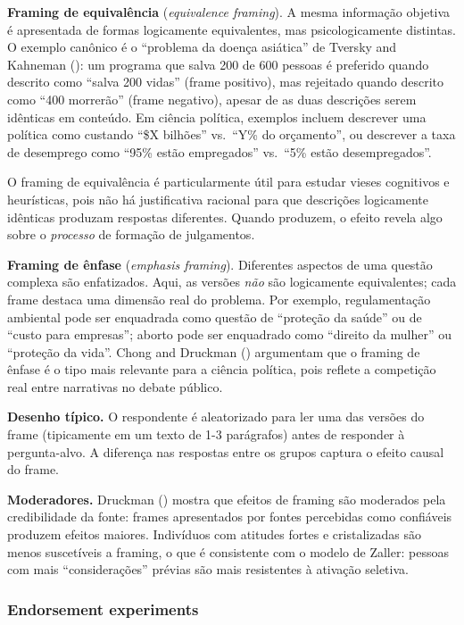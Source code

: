 \documentclass[
]{article}
\begin{document}
\textbf{Framing de equivalência} (\emph{equivalence framing}). A mesma informação objetiva é apresentada de formas logicamente equivalentes, mas psicologicamente distintas. O exemplo canônico é o ``problema da doença asiática'' de Tversky and Kahneman (): um programa que salva 200 de 600 pessoas é preferido quando descrito como ``salva 200 vidas'' (frame positivo), mas rejeitado quando descrito como ``400 morrerão'' (frame negativo), apesar de as duas descrições serem idênticas em conteúdo. Em ciência política, exemplos incluem descrever uma política como custando ``\$X bilhões'' vs.~``Y\% do orçamento'', ou descrever a taxa de desemprego como ``95\% estão empregados'' vs.~``5\% estão desempregados''.

O framing de equivalência é particularmente útil para estudar vieses cognitivos e heurísticas, pois não há justificativa racional para que descrições logicamente idênticas produzam respostas diferentes. Quando produzem, o efeito revela algo sobre o \emph{processo} de formação de julgamentos.

\textbf{Framing de ênfase} (\emph{emphasis framing}). Diferentes aspectos de uma questão complexa são enfatizados. Aqui, as versões \emph{não} são logicamente equivalentes; cada frame destaca uma dimensão real do problema. Por exemplo, regulamentação ambiental pode ser enquadrada como questão de ``proteção da saúde'' ou de ``custo para empresas''; aborto pode ser enquadrado como ``direito da mulher'' ou ``proteção da vida''. Chong and Druckman () argumentam que o framing de ênfase é o tipo mais relevante para a ciência política, pois reflete a competição real entre narrativas no debate público.

\textbf{Desenho típico.} O respondente é aleatorizado para ler uma das versões do frame (tipicamente em um texto de 1-3 parágrafos) antes de responder à pergunta-alvo. A diferença nas respostas entre os grupos captura o efeito causal do frame.

\textbf{Moderadores.} Druckman () mostra que efeitos de framing são moderados pela credibilidade da fonte: frames apresentados por fontes percebidas como confiáveis produzem efeitos maiores. Indivíduos com atitudes fortes e cristalizadas são menos suscetíveis a framing, o que é consistente com o modelo de Zaller: pessoas com mais ``considerações'' prévias são mais resistentes à ativação seletiva.

\subsubsection{Endorsement experiments}\label{endorsement-experiments}
\end{document}
